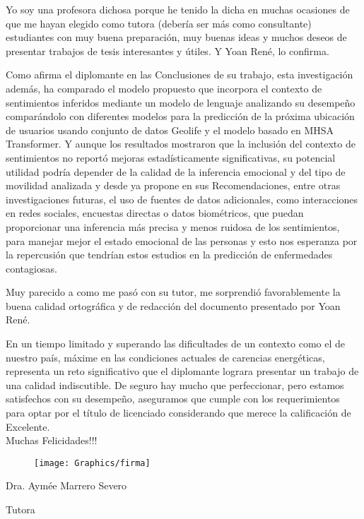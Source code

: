 \begin{opinion}
    Yo soy una profesora dichosa porque he tenido la dicha en muchas ocasiones de
    que me hayan elegido como tutora (debería ser más como consultante)
    estudiantes con muy buena preparación, muy buenas ideas y muchos deseos de
    presentar trabajos de tesis interesantes y útiles. Y Yoan René, lo confirma.

    Como afirma el diplomante en las Conclusiones de su trabajo, esta investigación
    además, ha comparado el modelo propuesto que incorpora el contexto de
    sentimientos inferidos mediante un modelo de lenguaje analizando su desempeño
    comparándolo con diferentes modelos para la predicción de la próxima ubicación
    de usuarios usando conjunto de datos Geolife y el modelo basado en MHSA
    Transformer. Y aunque los resultados mostraron que la inclusión del contexto de
    sentimientos no reportó mejoras estadísticamente significativas, su potencial
    utilidad podría depender de la calidad de la inferencia emocional y del tipo de
    movilidad analizada y desde ya propone en sus Recomendaciones, entre otras
    investigaciones futuras, el uso de fuentes de datos adicionales, como interacciones
    en redes sociales, encuestas directas o datos biométricos, que puedan
    proporcionar una inferencia más precisa y menos ruidosa de los sentimientos, para
    manejar mejor el estado emocional de las personas y esto nos esperanza por la
    repercusión que tendrían estos estudios en la predicción de enfermedades
    contagiosas.

    Muy parecido a como me pasó con su tutor, me sorprendió favorablemente la
    buena calidad ortográfica y de redacción del documento presentado por Yoan
    René.

    En un tiempo limitado y superando las dificultades de un contexto como el de
    nuestro país, máxime en las condiciones actuales de carencias energéticas,
    representa un reto significativo que el diplomante lograra presentar un trabajo de
    una calidad indiscutible. De seguro hay mucho que perfeccionar, pero estamos
    satisfechos con su desempeño, aseguramos que cumple con los requerimientos
    para optar por el título de licenciado considerando que merece la calificación de
    Excelente.\\

    Muchas Felicidades!!!
    
    
\begin{figure}[h]
    \hspace{1.5cm}
    \vspace{-0.5cm}
    \texttt{[image: Graphics/firma]}   
\end{figure}

\makebox[5cm]{\hrulefill} 

Dra. Aymée Marrero Severo

Tutora
\end{opinion}